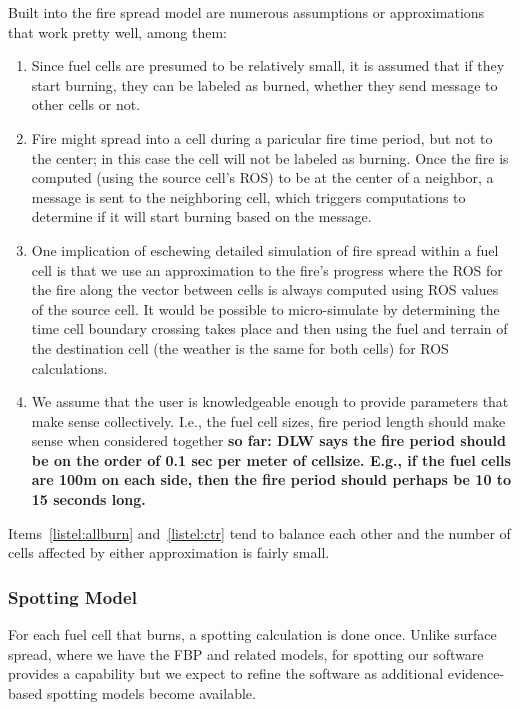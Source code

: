 \documentclass[11pt]{article}
\begin{document}
Built into the fire spread model are numerous assumptions or
approximations that work pretty well, among them:
\begin{enumerate}
\item \label{listel:allburn} Since fuel cells are presumed to be relatively small, it is assumed
  that if they start burning, they can be labeled as burned, whether they
  send message to other cells or not.
\item \label{listel:ctr} Fire might spread into a cell during a paricular fire time period, but not to the center; in this
  case the cell will not be labeled as burning. Once the fire is computed (using the source cell's ROS) to be at the center of a neighbor, a message is sent to the neighboring cell, which triggers computations to determine if it will start burning based on the message.
\item One implication of eschewing detailed simulation of fire spread within a fuel cell is that we use
  an approximation to the fire's progress where the ROS for the fire
  along the vector between cells is always computed using ROS values
  of the source cell. It would be possible to micro-simulate
  by determining the time cell boundary crossing takes place and then using the
  fuel and terrain of the destination cell (the weather is the same for both cells) for ROS calculations. 
\item We assume that the user is knowledgeable enough to provide
  parameters that make sense collectively. I.e., the fuel cell sizes, fire period length should make sense when considered together {\bf so far: DLW says the fire period should be on the order of 0.1 sec per meter of cellsize.
    E.g., if the fuel cells are 100m on each side, then the fire period should perhaps be 10 to 15 seconds
  long.}
  
  

\end{enumerate}

Items~\ref{listel:allburn} and~\ref{listel:ctr} tend to balance
each other and the number of cells affected by either approximation
is fairly small.

\subsubsection{Spotting Model \label{sec:spotmodel}}

For each fuel cell that burns, a spotting calculation is done once.
Unlike surface spread, where we have the FBP and related models, for spotting
our software provides a capability but we expect to refine the software as additional
evidence-based spotting models become available.
\end{document}

